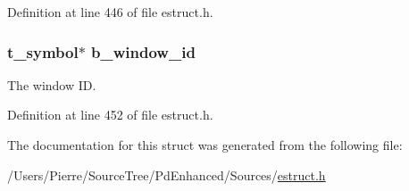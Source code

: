 Definition at line 446 of file estruct.\-h.

\hypertarget{struct__ebox_a7033df943e798c68e3a6117785c2d79e}{
\subsubsection[{b\-\_\-window\-\_\-id}]{\setlength{\rightskip}{0pt plus 5cm}t\-\_\-symbol$\ast$ b\-\_\-window\-\_\-id}}\label{struct__ebox_a7033df943e798c68e3a6117785c2d79e}
The window I\-D. 

Definition at line 452 of file estruct.\-h.



The documentation for this struct was generated from the following file\-:\begin{DoxyCompactItemize}
\item 
/\-Users/\-Pierre/\-Source\-Tree/\-Pd\-Enhanced/\-Sources/\hyperlink{estruct_8h}{estruct.\-h}\end{DoxyCompactItemize}
